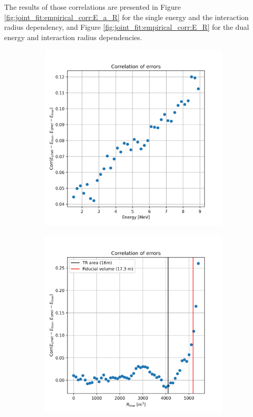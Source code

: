 \documentclass[../main.tex]{subfiles}
\begin{document}
The results of those correlations are presented in Figure \ref{fig:joint_fit:empirical_corr:E_a_R} for the single energy and the interaction radius dependency, and Figure \ref{fig:joint_fit:empirical_corr:E_R} for the dual energy and interaction radius dependencies.

\begin{figure}[ht]
  \centering
  \begin{subfigure}[t]{0.48\linewidth}
    \includegraphics[width=\linewidth]{images/joint_fit/E_corr.png}
  \end{subfigure}
  \hfill
  \begin{subfigure}[t]{0.48\linewidth}
    \includegraphics[width=\linewidth]{images/joint_fit/R_corr.png}

\end{subfigure}
\end{figure}
\end{document}

